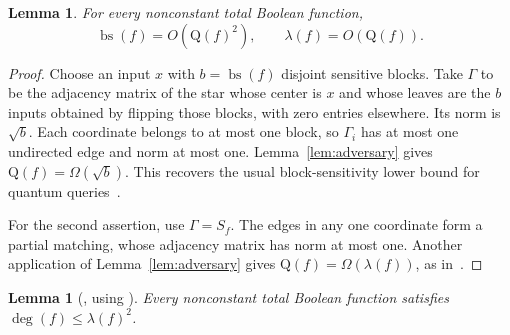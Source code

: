 \documentclass[11pt]{article}
\newtheorem{lemma}[theorem]{Lemma}
\theoremstyle{definition}
\newcommand{\Q}{\mathrm Q}
\newcommand{\bs}{\operatorname{bs}}
\begin{document}
\begin{lemma}\label{lem:bs-lambda}
For every nonconstant total Boolean function,
\[
 \bs(f)=O(\Q(f)^2),\qquad
 \lambda(f)=O(\Q(f)).
\]
\end{lemma}

\begin{proof}
Choose an input $x$ with $b=\bs(f)$ disjoint sensitive blocks. Take
$\Gamma$ to be the adjacency matrix of the star whose center is $x$
and whose leaves are the $b$ inputs obtained by flipping those blocks,
with zero entries elsewhere. Its norm is $\sqrt b$. Each coordinate
belongs to at most one block, so $\Gamma_i$ has at most one undirected
edge and norm at most one. Lemma~\ref{lem:adversary} gives
$\Q(f)=\Omega(\sqrt b)$. This recovers the usual block-sensitivity
lower bound for quantum queries~\cite{BBCMW01}.

For the second assertion, use $\Gamma=S_f$. The edges in any one
coordinate form a partial matching, whose adjacency matrix has norm
at most one. Another application of Lemma~\ref{lem:adversary} gives
$\Q(f)=\Omega(\lambda(f))$, as in~\cite{ABKRT21}.
\end{proof}

\begin{lemma}[\cite{ABKRT21}, using \cite{Huang19}]
\label{lem:degree-lambda}
Every nonconstant total Boolean function satisfies
$\deg(f)\le\lambda(f)^2$.
\end{lemma}
\end{document}
